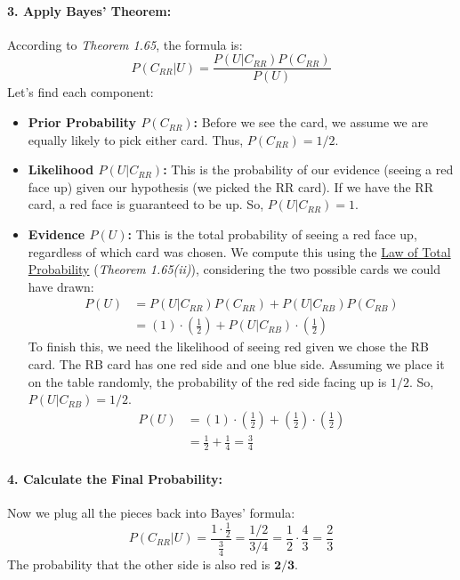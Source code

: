 \documentclass[11pt,a4paper]{article}
\theoremstyle{tutorstyle}
\newcommand{\concept}[2]{\hyperref[#1]{#2}}
\begin{document}
\paragraph{3. Apply Bayes' Theorem:}
According to \textit{Theorem 1.65}, the formula is:
\[
P(C_{RR} | U) = \frac{P(U | C_{RR}) P(C_{RR})}{P(U)}
\]
Let's find each component:
\begin{itemize}[leftmargin=*]
    \item \textbf{Prior Probability $P(C_{RR})$:} Before we see the card, we assume we are equally likely to pick either card. Thus, $P(C_{RR}) = 1/2$.

    \item \textbf{Likelihood $P(U | C_{RR})$:} This is the probability of our evidence (seeing a red face up) given our hypothesis (we picked the RR card). If we have the RR card, a red face is guaranteed to be up. So, $P(U | C_{RR}) = 1$.

    \item \textbf{Evidence $P(U)$:} This is the total probability of seeing a red face up, regardless of which card was chosen. We compute this using the \concept{concept_totalprob}{Law of Total Probability} (\textit{Theorem 1.65(ii)}), considering the two possible cards we could have drawn:
    \begin{align*}
        P(U) &= P(U | C_{RR})P(C_{RR}) + P(U | C_{RB})P(C_{RB}) \\
             &= (1) \cdot \left(\frac{1}{2}\right) + P(U | C_{RB}) \cdot \left(\frac{1}{2}\right)
    \end{align*}
    To finish this, we need the likelihood of seeing red given we chose the RB card. The RB card has one red side and one blue side. Assuming we place it on the table randomly, the probability of the red side facing up is $1/2$. So, $P(U | C_{RB}) = 1/2$.
    \begin{align*}
        P(U) &= (1) \cdot \left(\frac{1}{2}\right) + \left(\frac{1}{2}\right) \cdot \left(\frac{1}{2}\right) \\
             &= \frac{1}{2} + \frac{1}{4} = \frac{3}{4}
    \end{align*}
\end{itemize}

\paragraph{4. Calculate the Final Probability:}
Now we plug all the pieces back into Bayes' formula:
\[
P(C_{RR} | U) = \frac{1 \cdot \frac{1}{2}}{\frac{3}{4}} = \frac{1/2}{3/4} = \frac{1}{2} \cdot \frac{4}{3} = \frac{2}{3}
\]
The probability that the other side is also red is $\mathbf{2/3}$.
\end{document}
